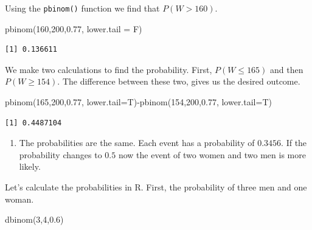 \documentclass[
  letterpaper,
  DIV=11,
  numbers=noendperiod]{scrreprt}
\newenvironment{Shaded}{\begin{snugshade}}{\end{snugshade}}
\newcommand{\AttributeTok}[1]{\textcolor[rgb]{0.40,0.45,0.13}{#1}}
\newcommand{\DecValTok}[1]{\textcolor[rgb]{0.68,0.00,0.00}{#1}}
\newcommand{\FloatTok}[1]{\textcolor[rgb]{0.68,0.00,0.00}{#1}}
\newcommand{\FunctionTok}[1]{\textcolor[rgb]{0.28,0.35,0.67}{#1}}
\newcommand{\NormalTok}[1]{\textcolor[rgb]{0.00,0.23,0.31}{#1}}
\newcommand{\SpecialCharTok}[1]{\textcolor[rgb]{0.37,0.37,0.37}{#1}}
\providecommand{\tightlist}{%
  \setlength{\itemsep}{0pt}\setlength{\parskip}{0pt}}\usepackage{longtable,booktabs,array}
\begin{document}
Using the \texttt{pbinom()} function we find that \(P(W>160)\).

\begin{Shaded}
\begin{Highlighting}[numbers=left,,]
\FunctionTok{pbinom}\NormalTok{(}\DecValTok{160}\NormalTok{,}\DecValTok{200}\NormalTok{,}\FloatTok{0.77}\NormalTok{, }\AttributeTok{lower.tail =}\NormalTok{ F)}
\end{Highlighting}
\end{Shaded}

\begin{verbatim}
[1] 0.136611
\end{verbatim}

We make two calculations to find the probability. First,
\(P(W \leq 165)\) and then \(P(W \geq 154)\). The difference between
these two, gives us the desired outcome.

\begin{Shaded}
\begin{Highlighting}[numbers=left,,]
\FunctionTok{pbinom}\NormalTok{(}\DecValTok{165}\NormalTok{,}\DecValTok{200}\NormalTok{,}\FloatTok{0.77}\NormalTok{, }\AttributeTok{lower.tail=}\NormalTok{T)}\SpecialCharTok{{-}}\FunctionTok{pbinom}\NormalTok{(}\DecValTok{154}\NormalTok{,}\DecValTok{200}\NormalTok{,}\FloatTok{0.77}\NormalTok{, }\AttributeTok{lower.tail=}\NormalTok{T)}
\end{Highlighting}
\end{Shaded}

\begin{verbatim}
[1] 0.4487104
\end{verbatim}

\begin{enumerate}
\def\labelenumi{\arabic{enumi}.}
\setcounter{enumi}{2}
\tightlist
\item
  The probabilities are the same. Each event has a probability of
  \(0.3456\). If the probability changes to \(0.5\) now the event of two
  women and two men is more likely.
\end{enumerate}

Let's calculate the probabilities in R. First, the probability of three
men and one woman.

\begin{Shaded}
\begin{Highlighting}[numbers=left,,]
\FunctionTok{dbinom}\NormalTok{(}\DecValTok{3}\NormalTok{,}\DecValTok{4}\NormalTok{,}\FloatTok{0.6}\NormalTok{)}
\end{Highlighting}
\end{Shaded}
\end{document}
